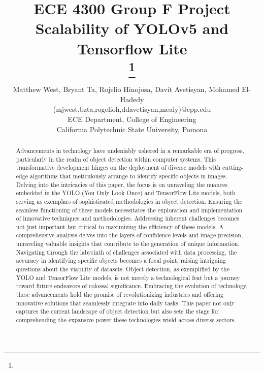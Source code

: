 \documentclass[conference]{IEEEtran}
\begin{document}
\title{ECE 4300 Group F Project\\
Scalability of YOLOv5 and Tensorflow Lite\\
{\footnotesize \textsuperscript{}}
\thanks{}
}

\author{Matthew West, Bryant Ta, Rojelio Hinojosa, Davit Avetisyan, Mohamed El-Hadedy\\(mjwest,bzta,rogelioh,ddavetisyan,mealy)@cpp.edu\\
ECE Department, College of Engineering\\
California Polytechnic State University, Pomona}

\maketitle

\begin{abstract}
Advancements in technology have undeniably ushered in a remarkable era of progress, particularly in the realm of object detection within computer systems. This transformative development hinges on the deployment of diverse models with cutting-edge algorithms that meticulously arrange to identify specific objects in images. Delving into the intricacies of this paper, the focus is on unraveling the nuances embedded in the YOLO (You Only Look Once) and TensorFlow Lite models, both serving as exemplars of sophisticated methodologies in object detection. Ensuring the seamless functioning of these models necessitates the exploration and implementation of innovative techniques and methodologies. Addressing inherent challenges becomes not just important but critical to maximizing the efficiency of these models. A comprehensive analysis delves into the layers of confidence levels and image precision, unraveling valuable insights that contribute to the generation of unique information. Navigating through the labyrinth of challenges associated with data processing, the accuracy in identifying specific objects becomes a focal point, raising intriguing questions about the viability of datasets. Object detection, as exemplified by the YOLO and TensorFlow Lite models, is not merely a technological feat but a journey toward future endeavors of colossal significance. Embracing the evolution of technology, these advancements hold the promise of revolutionizing industries and offering innovative solutions that seamlessly integrate into daily tasks. This paper not only captures the current landscape of object detection but also sets the stage for comprehending the expansive power these technologies wield across diverse sectors.   
\end{abstract}
\end{document}
